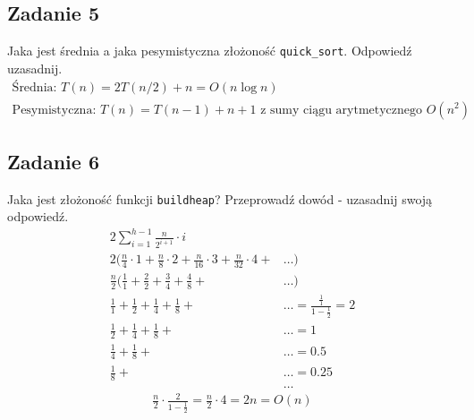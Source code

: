 \documentclass{article}
\begin{document}
\subsection*{Zadanie 5}
Jaka jest średnia a jaka pesymistyczna złożoność \verb+quick_sort+. Odpowiedź uzasadnij.
\begin{gather*}
    \text{Średnia: } T(n) = 2T(n/2) + n = O(n \log n) \\
    \text{Pesymistyczna: } T(n) = T(n-1) + n + 1 \text{ z sumy ciągu arytmetycznego } O(n^2)
\end{gather*}

\subsection*{Zadanie 6}
Jaka jest złożoność funkcji \verb+buildheap+? Przeprowadź dowód - uzasadnij swoją odpowiedź.
\begin{align*}
    2 \sum_{i=1}^{h-1} \frac{n}{2^{i+1}} \cdot i                                                 &                                               \\
    2 (\frac{n}{4} \cdot 1 + \frac{n}{8} \cdot 2 + \frac{n}{16} \cdot 3 + \frac{n}{32} \cdot 4 + & \dots)                                        \\
    \frac{n}{2} (\frac{1}{1} + \frac{2}{2} + \frac{3}{4} + \frac{4}{8} +                         & \dots)                                        \\
    \frac{1}{1} +  \frac{1}{2} +  \frac{1}{4} +  \frac{1}{8} +                                   & \dots = \frac{\frac{1}{1}}{1-\frac{1}{2}} = 2 \\
    \frac{1}{2} +  \frac{1}{4} +  \frac{1}{8} +                                                  & \dots = 1                                     \\
    \frac{1}{4} +  \frac{1}{8} +                                                                 & \dots = 0.5                                   \\
    \frac{1}{8} +                                                                                & \dots = 0.25                                  \\
                                                                                                 & \dots
\end{align*}
\begin{gather*}
    \frac{n}{2} \cdot \frac{2}{1-\frac{1}{2}} = \frac{n}{2} \cdot 4 = 2n = O(n)
\end{gather*}
\end{document}
